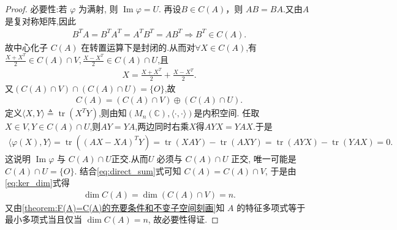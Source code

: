 \documentclass[../../main.tex]{subfiles}%
\begin{document}
\begin{proof}
{\heiti 必要性:}若 \(\varphi\) 为满射, 则 \(\operatorname{Im} \varphi = U\). 再设\(B \in C(A)\)，则 \(AB = BA\).又由\(A\) 是复对称矩阵,因此
\begin{align*}
B^T A=B^T A^T = A^T B^T=A B^T\Longrightarrow B^T \in C(A).
\end{align*}
故中心化子 \(C(A)\) 在转置运算下是封闭的.从而对$\forall X\in C(A)$,有$\frac{X+X^T}{2}\in C(A) \cap V,\frac{X-X^T}{2}\in C(A)\cap U$,且
\begin{align*}
X=\frac{X+X^T}{2}+\frac{X-X^T}{2}.
\end{align*}
又$(C(A) \cap V) \cap (C(A) \cap U)=\{O\}$,故
\begin{align}
C(A) = (C(A) \cap V) \oplus (C(A) \cap U). \label{eq:direct_sum}
\end{align}
定义\(\langle X, Y \rangle \triangleq \operatorname{tr}(X^T Y)\),则由知$(M_n(\mathbb{C}),\langle \cdot, \cdot \rangle)$是内积空间. 任取 \(X \in V, Y \in C(A) \cap U\),则\(AY=YA\),两边同时右乘$X$得$AYX=YAX$.于是
\begin{align*}
\langle \varphi(X), Y \rangle = \operatorname{tr}( (AX-XA)^T Y) = \operatorname{tr}(XAY) - \operatorname{tr}(AXY) = \operatorname{tr}(AYX) - \operatorname{tr}(YAX)=0.
\end{align*}
这说明 \(\operatorname{Im} \varphi\) 与 \(C(A) \cap U\)正交.从而\(U\) 必须与 \(C(A) \cap U\) 正交, 唯一可能是 \(C(A) \cap U = \{O\}\).
结合\eqref{eq:direct_sum}式可知 \(C(A) = C(A) \cap V\), 于是由 \eqref{eq:ker_dim}式得
\begin{align*}
\dim C(A) = \dim(C(A) \cap V) = n.
\end{align*}
又由\cref{theorem:F(A)=C(A)的充要条件和不变子空间刻画}知 \(A\) 的特征多项式等于最小多项式当且仅当 \(\dim C(A) = n\), 故必要性得证.
\end{proof}
\end{document}
